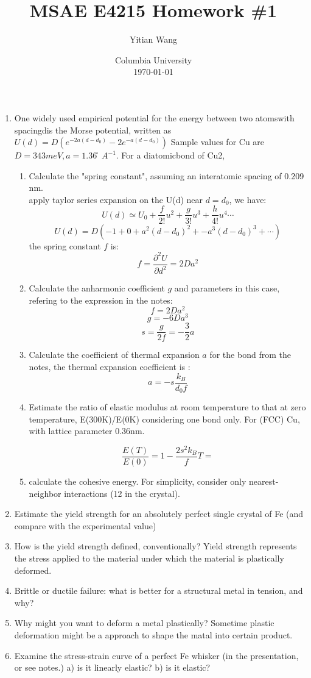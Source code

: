 \documentclass{article}
\title{MSAE E4215 Homework \#1}
\author{Yitian Wang}
\date{Columbia University \\ \today}
\begin{document}
\maketitle
\begin{enumerate}
\item One widely used empirical potential for the energy between two atomswith spacingdis the Morse potential, 
written as
$U(d) =D(e^{-2a(d - d_0)} - 2e^{ - a(d - d_0)})$
Sample values for Cu are $D= 343 meV, a= 1.36 ̊A^{-1}$.  
For a diatomicbond of Cu2,

\begin{enumerate}[label=(\alph*)]
\item Calculate the "spring constant", assuming an interatomic spacing of 0.209 nm.\\
apply taylor series expansion on the U(d) near $d=d_0$, we have:
$$U(d) \simeq U_{0}+\frac{f}{2 !} u^{2}+\frac{g}{3 !} u^{3}+\frac{h}{4 !} u^{4} \cdots$$
$$U(d)=D(-1 + 0 + a^2(d-d_0)^2 + {-a}^3(d-d_0)^3 + \cdots) $$
the spring constant $f$ is:
$$f=\frac{\partial^2 U}{\partial d^2}=2Da^2$$

\item Calculate the anharmonic coefficient $g$ and parameters
in this case, refering to the expression in the notes:
$$f=2Da^2$$
$$g=-6Da^3$$
$$s=\frac{g}{2f}=-\frac{3}{2} a $$
\item Calculate the coefficient of thermal expansion $a$ for the bond
from the notes, the thermal expansion coefficient is :
$$a= -s \frac{k_B}{d_0 f} $$

\item Estimate the ratio of elastic modulus at room temperature to that at zero temperature,
E(300K)/E(0K) considering one bond only. For (FCC) Cu, with lattice parameter 0.36nm.

$$
\frac{E(T)}{E(0)}=1-\frac{2 s^{2} k_{B}}{f} T =
$$
\item calculate the cohesive energy. For simplicity, consider only nearest-neighbor interactions (12 in the crystal).

\end{enumerate}


\item Estimate the yield strength for an absolutely perfect single crystal of Fe 
(and compare with the experimental value)

\item How is the yield strength defined, conventionally? 
Yield strength represents the stress applied to the material 
under which the material is plastically deformed.
\item Brittle or ductile failure: what is better for a structural metal in tension, 
and why?

\item Why might you want to deform a metal plastically? 
Sometime plastic deformation might be a approach to shape the matal into certain product. 

\item Examine the stress-strain curve of a perfect Fe whisker (in the presentation, or see notes.)  
a) is it linearly elastic?  b) is it elastic? 



\end{enumerate}
\end{document}
